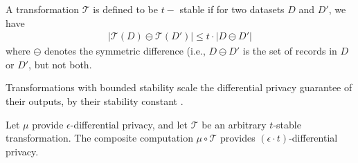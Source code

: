 \begin{definition}A transformation $\mathcal{T}$ is defined to be $t-$ stable if for two datasets $D$ and $D'$, we have\begin{gather}|\mathcal{T}(D)\ominus \mathcal{T}(D')| \leq t \cdot |D\ominus D'|  \end{gather} where $\ominus$ denotes the symmetric difference (i.e.,  $D \ominus D'$ is the set of records in $D$ or $D'$, but not both. \end{definition}
Transformations with bounded stability scale the differential privacy guarantee of their outputs, by their stability constant \cite{PINQ}.
\begin{theorem}
Let $\mu$ provide $\epsilon$-differential privacy, and let $\mathcal{T}$
be an arbitrary $t$-stable transformation. The composite computation $\mu \circ \mathcal{T}$ provides $(\epsilon \cdot t)$-differential privacy.\end{theorem}
